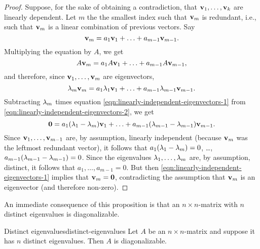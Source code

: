 \begin{proof}
  Suppose, for the sake of obtaining a contradiction, that
  $\mbox{\bf v}_1,\ldots,\mbox{\bf v}_k$ are linearly dependent. Let $m$ the
  the smallest index such that $\mbox{\bf v}_m$ is redundant, i.e., such
  that $\mbox{\bf v}_m$ is a linear combination of previous vectors.
  Say
  \begin{equation}\label{eqn:linearly-independent-eigenvectors-1}
    \mbox{\bf v}_m = a_1\mbox{\bf v}_1 + \ldots + a_{m-1}\mbox{\bf v}_{m-1}.
  \end{equation}
  Multiplying the equation by $A$, we get
  \begin{equation*}
    A\mbox{\bf v}_m = a_1A\mbox{\bf v}_1 + \ldots + a_{m-1}A\mbox{\bf v}_{m-1},
  \end{equation*}
  and therefore, since $\mbox{\bf v}_1,\ldots,\mbox{\bf v}_{m}$ are
  eigenvectors,
  \begin{equation}\label{eqn:linearly-independent-eigenvectors-2}
    \lambda_m\mbox{\bf v}_m = a_1\lambda_1\mbox{\bf v}_1 + \ldots + a_{m-1}\lambda_{m-1}\mbox{\bf v}_{m-1}.
  \end{equation}
  Subtracting $\lambda_m$ times equation
  {\eqref{eqn:linearly-independent-eigenvectors-1}}  from
  {\eqref{eqn:linearly-independent-eigenvectors-2}}, we get
  \begin{equation*}
    \mbox{\bf 0} = a_1(\lambda_1-\lambda_m)\mbox{\bf v}_1 + \ldots + a_{m-1}(\lambda_{m-1}-\lambda_{m-1})\mbox{\bf v}_{m-1}.
  \end{equation*}
  Since $\mbox{\bf v}_1,\ldots,\mbox{\bf v}_{m-1}$ are, by assumption,
  linearly independent (because $\mbox{\bf v}_m$ was the leftmost redundant
  vector), it follows that $a_1(\lambda_1-\lambda_m)=0$, \ldots,
  $a_{m-1}(\lambda_{m-1}-\lambda_{m-1})=0$. Since the eigenvalues
  $\lambda_1,\ldots,\lambda_m$ are, by assumption, distinct, it
  follows that $a_1,\ldots,a_{m-1}=0$. But then
  {\eqref{eqn:linearly-independent-eigenvectors-1}} implies that
  $\mbox{\bf v}_m=\mbox{\bf 0}$, contradicting the assumption that $\mbox{\bf v}_m$ is an
  eigenvector (and therefore non-zero).
\end{proof}

An immediate consequence of this proposition is that an $n\times n$-matrix
with $n$ distinct eigenvalues is diagonalizable.

\begin{corollary}{Distinct eigenvalues}{distinct-eigenvalues}
  Let $A$ be an $n\times n$-matrix and suppose it has $n$ distinct
  eigenvalues. Then $A$ is diagonalizable.
\end{corollary}


